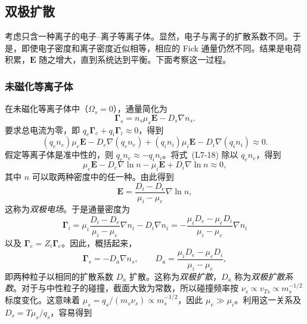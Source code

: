 \subsection{双极扩散}
考虑只含一种离子的电子--离子等离子体。显然，电子与离子的扩散系数不同。于是，即使电子密度和离子密度近似相等，相应的 Fick 通量仍然不同。结果是电荷积累，$\boldsymbol E$ 随之增大，直到系统达到平衡。下面考察这一过程。

\subsubsection{未磁化等离子体}
在未磁化等离子体中（$\Omega_s=0$），通量简化为
\begin{equation}
\boldsymbol\Gamma_s=n_s\mu_s\boldsymbol E-D_s\nabla n_s.
\tag{L7-17}\label{eq:L7:17}
\end{equation}
要求总电流为零，即 $q_e\boldsymbol\Gamma_e+q_i\boldsymbol\Gamma_i\approx0$，得到
\begin{equation}
(q_en_e)\mu_e\boldsymbol E-D_e\nabla(q_en_e)
+(q_in_i)\mu_i\boldsymbol E-D_i\nabla(q_in_i)\approx0.
\tag{L7-18}\label{eq:L7:18}
\end{equation}
假定等离子体是准中性的，则 $q_en_e\approx-q_in_i$。将式~(L7-18) 除以 $q_en_e$，得到
\begin{equation}
\mu_e\boldsymbol E-D_e\nabla\ln n-\mu_i\boldsymbol E+D_i\nabla\ln n\approx0,
\tag{L7-19}\label{eq:L7:19}
\end{equation}
其中 $n$ 可以取两种密度中的任一种。由此得到
\begin{equation}
\boldsymbol E=\frac{D_i-D_e}{\mu_i-\mu_e}\nabla\ln n,
\tag{L7-20}\label{eq:L7:20}
\end{equation}
这称为\emph{双极电场}。于是通量密度为
\begin{equation}
\boldsymbol\Gamma_i
=\mu_i\frac{D_i-D_e}{\mu_i-\mu_e}\nabla n_i-D_i\nabla n_i
=-\frac{\mu_iD_e-\mu_eD_i}{\mu_i-\mu_e}\nabla n_i
\tag{L7-21}\label{eq:L7:21}
\end{equation}
以及 $\boldsymbol\Gamma_e=Z_i\boldsymbol\Gamma_e$。因此，概括起来，
\begin{equation}
\boldsymbol\Gamma_s=-D_a\nabla n_s,\qquad
D_a=\frac{\mu_iD_e-\mu_eD_i}{\mu_i-\mu_e},
\tag{L7-22}\label{eq:L7:22}
\end{equation}
即两种粒子以相同的扩散系数 $D_a$ 扩散。这称为\emph{双极扩散}，$D_a$ 称为\emph{双极扩散系数}。对于与中性粒子的碰撞，截面大致为常数，所以碰撞频率按 $\nu_s\propto v_{Ts}\propto m_s^{-1/2}$ 标度变化。这意味着 $\mu_s=q_s/(m_s\nu_s)\propto m_s^{-1/2}$，因此 $\mu_e\gg\mu_i$。利用这一关系及 $D_s=T\mu_s/q_s$，容易得到

